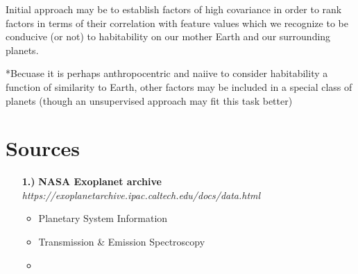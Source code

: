 \documentclass[12pt]{article}
\begin{document}
Initial approach may be to establish factors of high covariance in order to rank factors in terms of their correlation with feature values which we recognize to be conducive (or not) to habitability on our mother Earth and our surrounding planets.

*Becuase it is perhaps anthropocentric and naiive to consider habitability a function of similarity to Earth, other factors may be included in a special class of planets (though an unsupervised approach may fit this task better)

\section{Sources}

\begin{itemize}
\item[{\bf 1.)}] \textbf{ NASA Exoplanet archive} \\
\emph{https://exoplanetarchive.ipac.caltech.edu/docs/data.html}
\begin{itemize}
\item Planetary System Information
\item Transmission \& Emission Spectroscopy
\item 
\end{itemize}
\end{itemize}
\end{document}
